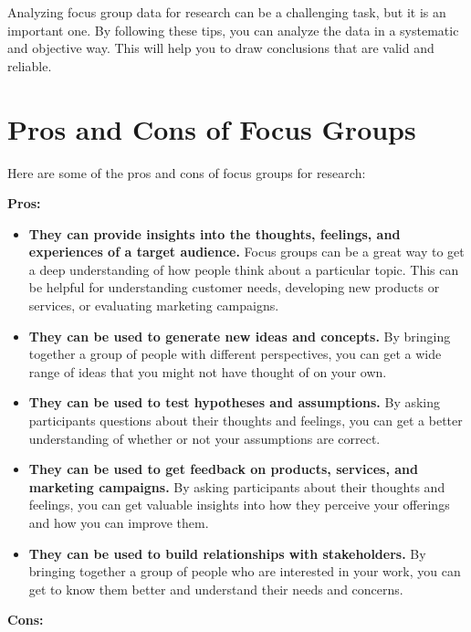 \documentclass[
  b5paper]{book}
\begin{document}
Analyzing focus group data for research can be a challenging task, but it is an important one. By following these tips, you can analyze the data in a systematic and objective way. This will help you to draw conclusions that are valid and reliable.

\hypertarget{pros-and-cons-of-focus-groups}{%
\section*{Pros and Cons of Focus Groups}\label{pros-and-cons-of-focus-groups}}

Here are some of the pros and cons of focus groups for research:

\textbf{Pros:}

\begin{itemize}
\item
  \textbf{They can provide insights into the thoughts, feelings, and experiences of a target audience.} Focus groups can be a great way to get a deep understanding of how people think about a particular topic. This can be helpful for understanding customer needs, developing new products or services, or evaluating marketing campaigns.
\item
  \textbf{They can be used to generate new ideas and concepts.} By bringing together a group of people with different perspectives, you can get a wide range of ideas that you might not have thought of on your own.
\item
  \textbf{They can be used to test hypotheses and assumptions.} By asking participants questions about their thoughts and feelings, you can get a better understanding of whether or not your assumptions are correct.
\item
  \textbf{They can be used to get feedback on products, services, and marketing campaigns.} By asking participants about their thoughts and feelings, you can get valuable insights into how they perceive your offerings and how you can improve them.
\item
  \textbf{They can be used to build relationships with stakeholders.} By bringing together a group of people who are interested in your work, you can get to know them better and understand their needs and concerns.
\end{itemize}

\textbf{Cons:}
\end{document}
